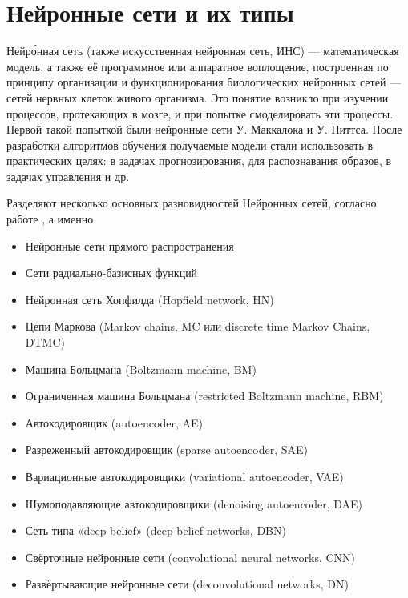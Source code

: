 \section{Нейронные сети и их типы}

Нейро́нная сеть (также искусственная нейронная сеть, ИНС) — математическая модель, а также её программное или аппаратное воплощение, 
построенная по принципу организации и функционирования биологических нейронных сетей — сетей нервных клеток живого организма. 
Это понятие возникло при изучении процессов, протекающих в мозге, и при попытке смоделировать эти процессы. Первой такой попыткой 
были нейронные сети У. Маккалока и У. Питтса. После разработки алгоритмов обучения получаемые модели стали использовать в практических 
целях: в задачах прогнозирования, для распознавания образов, в задачах управления и др. 

Разделяют несколько основных разновидностей Нейронных сетей, согласно работе \cite{neural01}, а именно:
\begin{itemize}
	\item Нейронные сети прямого распространения
	\item Сети радиально-базисных функций
	\item Нейронная сеть Хопфилда (Hopfield network, HN)
	\item Цепи Маркова (Markov chains, MC или discrete time Markov Chains, DTMC)
	\item Машина Больцмана (Boltzmann machine, BM)
	\item Ограниченная машина Больцмана (restricted Boltzmann machine, RBM)
	\item Автокодировщик (autoencoder, AE)
	\item Разреженный автокодировщик (sparse autoencoder, SAE)
	\item Вариационные автокодировщики (variational autoencoder, VAE)
	\item Шумоподавляющие автокодировщики (denoising autoencoder, DAE)
	\item Сеть типа «deep belief» (deep belief networks, DBN)
	\item Свёрточные нейронные сети (convolutional neural networks, CNN)
	\item Развёртывающие нейронные сети (deconvolutional networks, DN)
\end{itemize}

